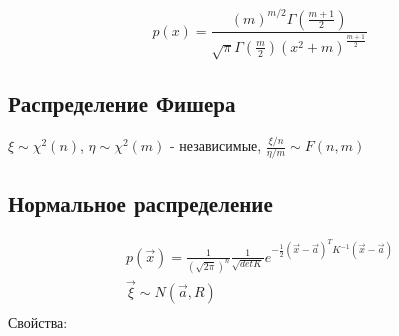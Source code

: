 \documentclass{article}
\begin{document}
\[
  p(x)=\frac{(m)^{m/2}\Gamma(\frac{m+1}{2})}{\sqrt{\pi}\Gamma(\frac{m}{2})(x^2+m)^{\frac{m+1}{2}}}
\]

\subsection{Распределение Фишера}
$\xi\sim \chi^2(n)$, $\eta\sim \chi^2(m)$ - независимые, $\frac{\xi/n}{\eta/m}\sim F(n,m)$

\subsection{Нормальное распределение}
\begin{gather*}
  p(\vec{x})=\frac{1}{(\sqrt{2\pi})^n}\frac{1}{\sqrt{detK}}e^{-\frac{1}{2}(\vec{x}-\vec{a})^T K^{-1}(\vec{x}-\vec{a})} \\
  \vec{\xi}\sim N(\vec{a},R)\\
\end{gather*}
Свойства:
\end{document}
